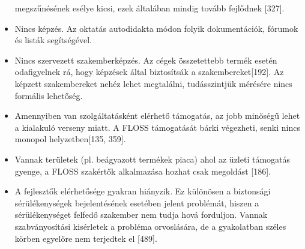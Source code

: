 \documentclass[12pt,magyar,a4paper,oneside]{scrreprt}
\begin{document}
\begin{itemize}
  megszűnésének esélye kicsi, ezek általában mindig tovább fejlődnek
  {[}327{]}.
\item
  Nincs képzés. Az oktatás autodidakta módon folyik dokumentációk,
  fórumok és listák segítségével.
\item
  Nincs szervezett szakemberképzés. Az cégek összetettebb termék esetén
  odafigyelnek rá, hogy képzések által biztosítsák a
  szakembereket{[}192{]}. Az képzett szakembereket nehéz lehet
  megtalálni, tudásszintjük mérésére nincs formális lehetőség.
\item
  Amennyiben van szolgáltatásként elérhető támogatás, az jobb minőségű
  lehet a kialakuló verseny miatt. A FLOSS támogatását bárki végezheti,
  senki nincs monopol helyzetben{[}135, 359{]}.
\item
  Vannak területek (pl. beágyazott termékek piaca) ahol az üzleti
  támogatás gyenge, a FLOSS szakértők alkalmazása hozhat csak megoldást
  {[}186{]}.
\item
  A fejlesztők elérhetősége gyakran hiányzik. Ez különösen a biztonsági
  sérülékenységek bejelentésének esetében jelent problémát, hiszen a
  sérülékenységet felfedő szakember nem tudja hová forduljon. Vannak
  szabványosítási kisérletek a probléma orvoslására, de a gyakolatban
  széles körben egyelőre nem terjedtek el {[}489{]}.
\end{itemize}
\end{document}
